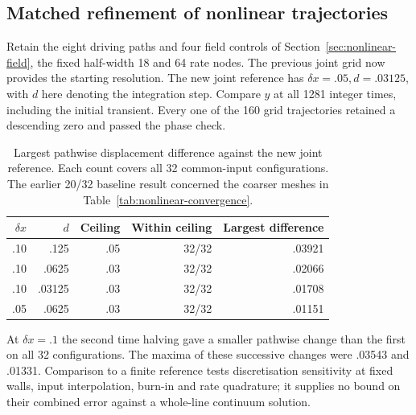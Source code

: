 \documentclass[11pt]{article}
\begin{document}
\subsection{Matched refinement of nonlinear trajectories}
Retain the eight driving paths and four field controls of
Section~\ref{sec:nonlinear-field}, the fixed half-width 18 and 64 rate
nodes. The previous joint grid now provides the starting resolution.
The new joint reference has \(\delta x=.05,d=.03125\), with \(d\) here
denoting the integration step. Compare \(y\) at all 1281 integer times,
including the initial transient. Every one of the 160 grid trajectories
retained a descending zero and passed the phase check.
\begin{table}[htbp]\centering\small
\caption{Largest pathwise displacement difference against the new joint
reference. Each count covers all 32 common-input configurations.
The earlier 20/32 baseline result concerned the coarser meshes in
Table~\ref{tab:nonlinear-convergence}.}
\begin{tabular}{rrrrr}\toprule
\(\delta x\) & \(d\) & Ceiling & Within ceiling & Largest difference\\\midrule
.10 & .125   & .05 & 32/32 & .03921\\
.10 & .0625  & .03 & 32/32 & .02066\\
.10 & .03125 & .03 & 32/32 & .01708\\
.05 & .0625  & .03 & 32/32 & .01151\\\bottomrule
\end{tabular}\label{tab:refined-paths}\end{table}
At \(\delta x=.1\) the second time halving gave a smaller pathwise
change than the first on all 32 configurations. The maxima of these
successive changes were .03543 and .01331. Comparison to a finite
reference tests discretisation sensitivity at fixed walls, input
interpolation, burn-in and rate quadrature; it supplies no bound on
their combined error against a whole-line continuum solution.
\end{document}
